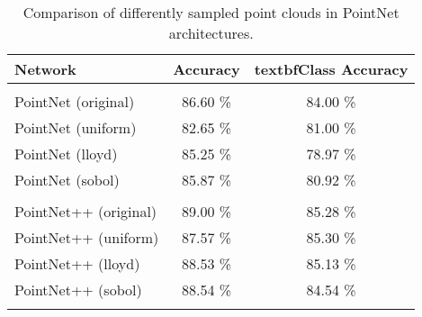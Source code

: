 \begin{table}[]
	\centering
	\begin{tabular}{lcc}
		\hline
		\textbf{Network}      & \textbf{ Accuracy } & textbf{Class Accuracy } \\ \hline
		                      &                     &                         \\
		PointNet (original)   &      86.60 \%       &        84.00 \%         \\
		PointNet (uniform)    &      82.65 \%       &        81.00 \%         \\
		PointNet (lloyd)      &      85.25 \%       &        78.97 \%         \\
		PointNet (sobol)      &      85.87 \%       &        80.92 \%         \\
		                      &                     &                         \\
		PointNet++ (original) &      89.00 \%       &        85.28 \%         \\
		PointNet++ (uniform)  &      87.57 \%       &        85.30 \%         \\
		PointNet++ (lloyd)    &      88.53 \%       &        85.13 \%         \\
		PointNet++ (sobol)    &      88.54 \%       &        84.54 \%         \\
		                      &                     &                         \\ \hline
	\end{tabular}
\caption{Comparison of differently sampled point clouds in PointNet architectures.}
\label{Table:pn}
\end{table}
